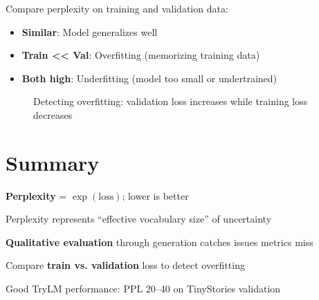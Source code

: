 Compare perplexity on training and validation data:

\begin{itemize}
    \item \textbf{Similar}: Model generalizes well
    \item \textbf{Train << Val}: Overfitting (memorizing training data)
    \item \textbf{Both high}: Underfitting (model too small or undertrained)
\end{itemize}

\begin{figure}[H]
\centering
{}
\caption{Detecting overfitting: validation loss increases while training loss decreases}
\label{fig:overfitting}
\end{figure}

\section{Summary}

\begin{summary}
    \item \textbf{Perplexity} = $\exp(\text{loss})$; lower is better
    \item Perplexity represents ``effective vocabulary size'' of uncertainty
    \item \textbf{Qualitative evaluation} through generation catches issues metrics miss
    \item Compare \textbf{train vs. validation} loss to detect overfitting
    \item Good TryLM performance: PPL 20--40 on TinyStories validation
\end{summary}

